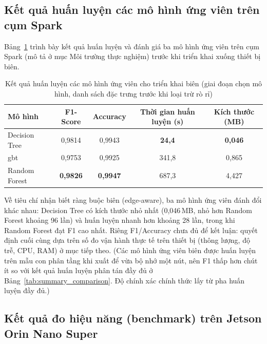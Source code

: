\subsection{Kết quả huấn luyện các mô hình ứng viên trên cụm Spark}

Bảng~\ref{tab:edge_training} trình bày kết quả huấn luyện và đánh giá ba mô hình ứng viên trên cụm Spark (mô tả ở mục Môi trường thực nghiệm) trước khi triển khai xuống thiết bị biên.

\begin{table}[htbp]
\centering
\caption[Các mô hình ứng viên cho triển khai biên (giai đoạn chọn mô hình)]{Kết quả huấn luyện các mô hình ứng viên cho triển khai biên (giai đoạn chọn mô hình, danh sách đặc trưng trước khi loại trừ rò rỉ)}
\label{tab:edge_training}
\begin{tabular*}{\textwidth}{@{\extracolsep{\fill}}lcccc@{}}
\toprule
\textbf{Mô hình} & \textbf{F1-Score} & \textbf{Accuracy} & \textbf{Thời gian huấn luyện (s)} & \textbf{Kích thước (MB)} \\ \midrule
Decision Tree    & 0{,}9814 & 0{,}9943 & \textbf{24{,}4} & \textbf{0{,}046} \\
\ac{gbt}              & 0{,}9753 & 0{,}9925 & 341{,}8 & 0{,}865 \\
Random Forest    & \textbf{0{,}9826} & \textbf{0{,}9947} & 687{,}3 & 4{,}427 \\
\bottomrule
\end{tabular*}
\end{table}

Về tiêu chí nhận biết ràng buộc biên (edge-aware), ba mô hình ứng viên đánh đổi khác nhau: Decision Tree có kích thước nhỏ nhất (0{,}046\,MB, nhỏ hơn Random Forest khoảng 96 lần) và huấn luyện nhanh hơn khoảng 28 lần, trong khi Random Forest đạt F1 cao nhất. Riêng F1/Accuracy chưa đủ để kết luận: quyết định cuối cùng dựa trên số đo vận hành thực tế trên thiết bị (thông lượng, độ trễ, CPU, RAM) ở mục tiếp theo. (Các mô hình ứng viên biên được huấn luyện trên mẫu con phân tầng khi xuất để vừa bộ nhớ một nút, nên F1 thấp hơn chút ít so với kết quả huấn luyện phân tán đầy đủ ở Bảng~\ref{tab:summary_comparison}. Độ chính xác chính thức lấy từ pha huấn luyện đầy đủ.)


\subsection{Kết quả đo hiệu năng (benchmark) trên Jetson Orin Nano Super}

